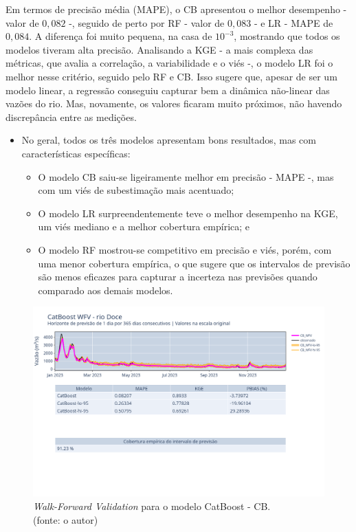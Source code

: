 Em termos de precisão média (MAPE), o CB apresentou o melhor desempenho - valor de $0,082$ -, seguido de perto por RF - valor de $0,083$ - e LR - MAPE de $0,084$. A diferença foi muito pequena, na casa de $10^{-3}$, mostrando que todos os modelos tiveram alta precisão. Analisando a KGE - a mais complexa das métricas, que avalia a correlação, a variabilidade e o viés -, o modelo LR foi o melhor nesse critério, seguido pelo RF e CB. Isso sugere que, apesar de ser um modelo linear, a regressão conseguiu capturar bem a dinâmica não-linear das vazões do rio. Mas, novamente, os valores ficaram muito próximos, não havendo discrepância entre as medições.

\begin{itemize}
\item No geral, todos os três modelos apresentam bons resultados, mas com características específicas:
\begin{itemize}
\item O modelo CB saiu-se ligeiramente melhor em precisão - MAPE -, mas com um viés de subestimação mais acentuado;
\item O modelo LR surpreendentemente teve o melhor desempenho na KGE, um viés mediano e a melhor cobertura empírica; e
\item O modelo RF mostrou-se competitivo em precisão e viés, porém, com uma menor cobertura empírica, o que sugere que os intervalos de previsão são menos eficazes para capturar a incerteza nas previsões quando comparado aos demais modelos.
\end{itemize}
\end{itemize}

\begin{figure}[!h]
\centering
\includegraphics[scale=0.33]{Figuras/rio_doce/wfv/CB/CB_WFV_ORIG.png}
\caption{\textit{Walk-Forward Validation} para o modelo CatBoost - CB.\\(fonte: o autor)}
\label{fig:doce_CB_WFV_ORIG}
\end{figure}

